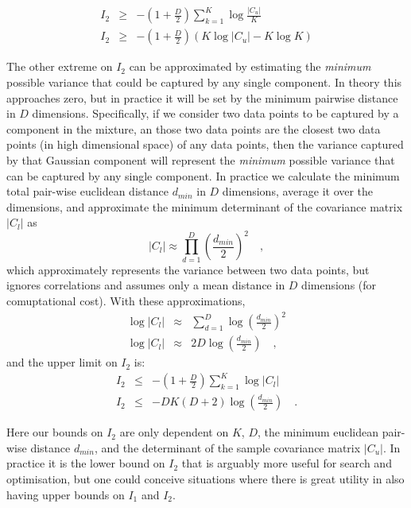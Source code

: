 \documentclass{elsarticle}
\def\cov{C}
\begin{document}
\begin{eqnarray}
    I_{2} & \geq & -\left(1 + \frac{D}{2}\right)\sum_{k=1}^{K}\log{\frac{|\cov_u|}{K}} \nonumber \\
    I_{2} & \geq & -\left(1 + \frac{D}{2}\right)\left(K\log{|\cov_u|} - K\log{K}\right) 
\end{eqnarray}


The other extreme on $I_2$ can be approximated by estimating the \emph{minimum}
possible variance that could be captured by any single component. In theory
this approaches zero, but in practice it will be set by the minimum pairwise
distance in $D$ dimensions. Specifically, if we consider two data points to be
captured by a component in the mixture, an those two data points are the
closest two data points (in high dimensional space) of any data points, then
the variance captured by that Gaussian component will represent the \emph{minimum}
possible variance that can be captured by any single component.  
In practice we calculate the minimum total pair-wise euclidean distance $d_{min}$
in $D$ dimensions, average it over the dimensions, and approximate the minimum
determinant of the covariance matrix $|\cov_l|$ as
\begin{equation}
    |\cov_{l}| \approx \prod_{d=1}^{D}\left(\frac{d_{min}}{2}\right)^2 \quad ,
\end{equation}
\noindent{}which approximately represents the variance between two data points,
but ignores correlations and assumes only a mean distance in $D$ dimensions
(for comuptational cost). With these approximations,
\begin{eqnarray}
    \log{|\cov_{l}|} & \approx & \sum_{d=1}^{D}\log{\left(\frac{d_{min}}{2}\right)^2}  \nonumber \\
    \log{|\cov_{l}|} & \approx & 2D\log{\left(\frac{d_{min}}{2}\right)} \quad ,
\end{eqnarray}
\noindent{}and the upper limit on $I_2$ is:
\begin{eqnarray}
    I_{2} & \leq & -\left(1 + \frac{D}{2}\right)\sum_{k=1}^{K}\log{|\cov_l|} \nonumber \\
    I_{2} & \leq & -DK\left(D+2\right)\log{\left(\frac{d_{min}}{2}\right)} \quad .
\end{eqnarray}

Here our bounds on $I_2$ are only dependent on $K$, $D$, the minimum euclidean
pair-wise distance $d_{min}$, and the determinant of the sample covariance
matrix $|\cov_u|$. In practice it is the lower bound on $I_{2}$ that is 
arguably more useful for search and optimisation, but one could conceive
situations where there is great utility in also having upper bounds on $I_1$
and $I_2$.
\end{document}

